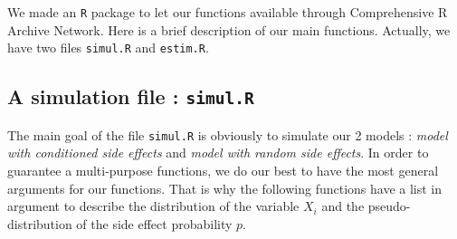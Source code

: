 \documentclass[12pt,twoside]{article}
\begin{document}
We made an \texttt{R} package to let our functions available through Comprehensive R Archive Network. Here is a brief description of 
our main functions. Actually, we have two files \texttt{simul.R} and \texttt{estim.R}.


\subsection{A simulation file : \texttt{simul.R}}
The main goal of the file \texttt{simul.R} is obviously to simulate our 2 models
: \textsl{model with conditioned side effects} and \textsl{model with random side effects}.
In order to guarantee a multi-purpose functions, we do our best to have the 
most general arguments for our functions. That is why the following functions have 
a list in argument to describe the distribution of the variable $X_i$ and 
the pseudo-distribution of the side effect probability $p$.
\end{document}
